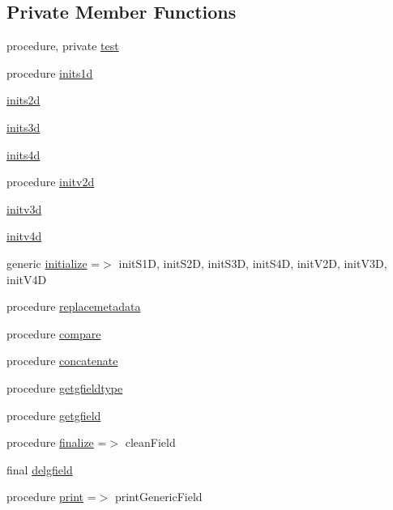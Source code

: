 \subsection*{Private Member Functions}
\begin{DoxyCompactItemize}
\item 
procedure, private \mbox{\hyperlink{structfieldtypes__mod_1_1generic__field__class_a884e1d0b4152f873edc421ee4079aafb}{test}}
\item 
procedure \mbox{\hyperlink{structfieldtypes__mod_1_1generic__field__class_a6a077022127f5450a2e77c034704ad2d}{inits1d}}
\item 
\mbox{\hyperlink{structfieldtypes__mod_1_1generic__field__class_ac813b40a98c7b82891bb51e6b0d56124}{inits2d}}
\item 
\mbox{\hyperlink{structfieldtypes__mod_1_1generic__field__class_a4de3770c55241bf94b3ffa523d3480f9}{inits3d}}
\item 
\mbox{\hyperlink{structfieldtypes__mod_1_1generic__field__class_ac5d07c1ce61968e5819ba410e003aec8}{inits4d}}
\item 
procedure \mbox{\hyperlink{structfieldtypes__mod_1_1generic__field__class_a5fbc115c9217689159b99058d1e38467}{initv2d}}
\item 
\mbox{\hyperlink{structfieldtypes__mod_1_1generic__field__class_a4641235772209bcc9558d6d6c53a80c7}{initv3d}}
\item 
\mbox{\hyperlink{structfieldtypes__mod_1_1generic__field__class_a178957bfe9f480ff799ca870d13db306}{initv4d}}
\item 
generic \mbox{\hyperlink{structfieldtypes__mod_1_1generic__field__class_a0fa61024cf22776788544cf848d767d7}{initialize}} =$>$ init\+S1D, init\+S2D, init\+S3D, init\+S4D, init\+V2D, init\+V3D, init\+V4D
\item 
procedure \mbox{\hyperlink{structfieldtypes__mod_1_1generic__field__class_a040a6a67e64938b6ce249dd6a584584f}{replacemetadata}}
\item 
procedure \mbox{\hyperlink{structfieldtypes__mod_1_1generic__field__class_a8dec8ff3e2f37167c4952805f5d189e9}{compare}}
\item 
procedure \mbox{\hyperlink{structfieldtypes__mod_1_1generic__field__class_a6424e68038376c898b08883fe1ed1304}{concatenate}}
\item 
procedure \mbox{\hyperlink{structfieldtypes__mod_1_1generic__field__class_a293a405922469cfc6e2fd61401a0bac7}{getgfieldtype}}
\item 
procedure \mbox{\hyperlink{structfieldtypes__mod_1_1generic__field__class_a7f87f8c7bbef845b3164831b369c752e}{getgfield}}
\item 
procedure \mbox{\hyperlink{structfieldtypes__mod_1_1generic__field__class_ab787d81bd092318c61cb43fe0b255dca}{finalize}} =$>$ clean\+Field
\item 
final \mbox{\hyperlink{structfieldtypes__mod_1_1generic__field__class_a14b5aa7f77712f703849552381484eed}{delgfield}}
\item 
procedure \mbox{\hyperlink{structfieldtypes__mod_1_1generic__field__class_a436070152766aaf4f47e56a1dba98611}{print}} =$>$ print\+Generic\+Field
\end{DoxyCompactItemize}
